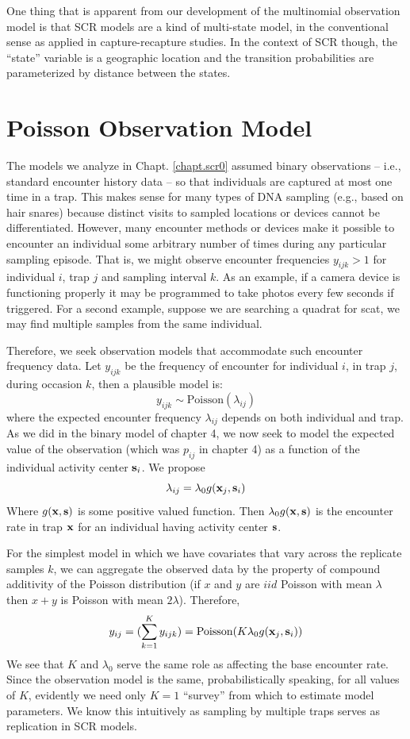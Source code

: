 One thing that is apparent from our development of the multinomial
observation model is that SCR models are a kind of multi-state model,
in the conventional sense as applied in capture-recapture studies. In
the context of SCR though, the ``state'' variable is a geographic
location and the transition probabilities are parameterized by
distance between the states. 





\section{Poisson Observation Model}

The models we analyze in Chapt. \ref{chapt.scr0} assumed binary
observations -- i.e., standard encounter history data -- so
that individuals are captured at most one time in a trap.  This makes
sense for many types of DNA sampling (e.g., based on hair snares)
because distinct visits to sampled locations or devices cannot be
differentiated. However, many encounter methods or devices make it
possible to encounter an individual some arbitrary number of times
during any particular sampling episode. That is, we might observe
encounter frequencies $y_{ijk}>1$ 
for individual $i$, trap $j$ and
sampling interval $k$.  As an example, if a camera device is
functioning properly it may be programmed to take photos every few
seconds if triggered.  For a second example, suppose we are searching
a quadrat for scat, we may find multiple samples from the same
individual.

Therefore, we seek observation models that accommodate such encounter
frequency data.  Let $y_{ijk}$ be the frequency of encounter for
individual $i$, in trap $j$, during occasion $k$, then a plausible
model is:
\[
 y_{ijk} \sim \mbox{Poisson}(\lambda_{ij})
\]
where the expected encounter frequency $\lambda_{ij}$ depends on both
individual and trap. As we did in the binary model of chapter 4, we
now seek to model the expected value of the observation (which was
$p_{ij}$ in chapter 4) as a function of the individual activity center
${\bf s}_{i}$.
We propose 
\[
 \lambda_{ij} = \lambda_{0}  g({\bf x}_{j},{\bf s}_{i})
\]
Where $g({\bf x},{\bf s})$ is some positive valued function. 
Then $\lambda_{0}g({\bf x},{\bf s})$ is the encounter rate in trap
${\bf x}$ for an individual having activity center ${\bf s}$.  

For the simplest model in which we have covariates that vary across
the replicate samples $k$, we can aggregate the observed data by the
property of compound additivity of the Poisson distribution (if $x$ and
$y$ are $iid$ Poisson with mean $\lambda$ then $x+y$ is Poisson with
mean $2\lambda$). Therefore,
\[
y_{ij} = (\sum_{k=1}^{K} y_{ijk}) =  \mbox{Poisson}(K  \lambda_{0} 
g({\bf x}_{j},{\bf s}_{i}) )
\]
We see that $K$ and $\lambda_{0}$ serve the same role as affecting the
base encounter rate. Since the observation model is the same,
probabilistically speaking, for all values of $K$, evidently we need
only $K=1$ ``survey'' from which to estimate model parameters. We know
this intuitively as sampling by multiple traps serves as replication
in SCR models.


